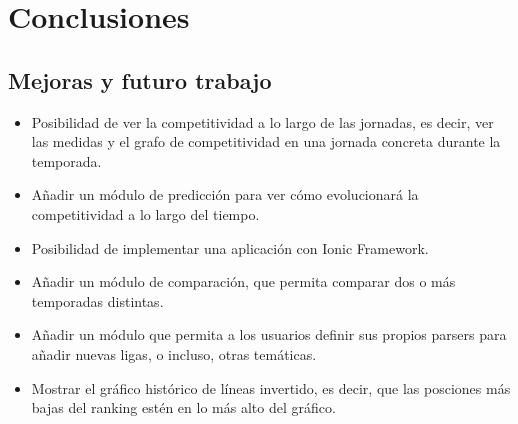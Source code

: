 \chapter{Conclusiones}

\section{Mejoras y futuro trabajo}

\begin{itemize}
\item Posibilidad de ver la competitividad a lo largo de las jornadas, es decir, ver las medidas y el grafo de competitividad en una jornada concreta durante la temporada.

\item Añadir un módulo de predicción para ver cómo evolucionará la competitividad a lo largo del tiempo.

\item Posibilidad de implementar una aplicación con Ionic Framework.

\item Añadir un módulo de comparación, que permita comparar dos o más temporadas distintas.

\item Añadir un módulo que permita a los usuarios definir sus propios parsers para añadir nuevas ligas, o incluso, otras temáticas.

\item Mostrar el gráfico histórico de líneas invertido, es decir, que las posciones más bajas del ranking estén en lo más alto del gráfico. 
\end{itemize}
